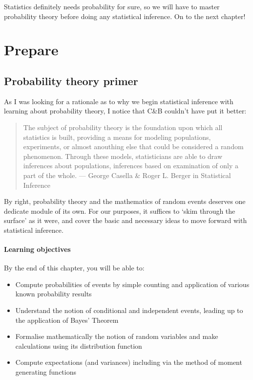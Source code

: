 \documentclass[
]{book}
\providecommand{\tightlist}{%
  \setlength{\itemsep}{0pt}\setlength{\parskip}{0pt}}
\theoremstyle{definition}
\theoremstyle{definition}
\theoremstyle{definition}
\theoremstyle{definition}
\theoremstyle{remark}
\begin{document}
Statistics definitely needs probability for sure, so we will have to master probability theory before doing any statistical inference. On to the next chapter!

\hypertarget{part-prepare}{%
\part{Prepare}\label{part-prepare}}

\hypertarget{probability-theory-primer}{%
\chapter{Probability theory primer}\label{probability-theory-primer}}

As I was looking for a rationale as to why we begin statistical inference with learning about probability theory, I notice that C\&B couldn't have put it better:

\begin{quote}
The subject of probability theory is the foundation upon which all statistics is built, providing a means for modeling populations, experiments, or almost anouthing else that could be considered a random phenomenon. Through these models, statisticians are able to draw inferences about populations, inferences based on examination of only a part of the whole. --- George Casella \& Roger L. Berger in Statistical Inference
\end{quote}

By right, probability theory and the mathematics of random events deserves one dedicate module of its own. For our purposes, it suffices to `skim through the surface' as it were, and cover the basic and necessary ideas to move forward with statistical inference.

\hypertarget{learning-objectives}{%
\subsection*{Learning objectives}\label{learning-objectives}}

By the end of this chapter, you will be able to:

\begin{itemize}
\tightlist
\item
  Compute probabilities of events by simple counting and application of various known probability results
\item
  Understand the notion of conditional and independent events, leading up to the application of Bayes' Theorem
\item
  Formalise mathematically the notion of random variables and make calculations using its distribution function
\item
  Compute expectations (and variances) including via the method of moment generating functions
\end{itemize}
\end{document}
